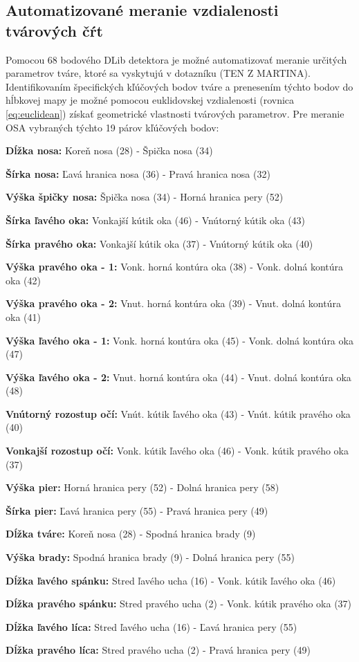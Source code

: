 \subsection{Automatizované meranie vzdialenosti tvárových čŕt}
Pomocou 68 bodového DLib detektora je možné automatizovať meranie určitých parametrov tváre, ktoré sa vyskytujú v dotazníku (TEN Z MARTINA). 
Identifikovaním špecifických kľúčových bodov tváre a prenesením týchto bodov do hĺbkovej mapy je možné pomocou euklidovskej vzdialenosti (rovnica \ref{eq:euclidean}) získať geometrické vlastnosti tvárových parametrov.
Pre meranie OSA vybraných týchto 19 párov kľúčových bodov: 
\vskip 0.2in

\begin{compactitem}
	\item[\textbf{Dĺžka nosa:}] Koreň nosa (28) - Špička nosa (34)
	\item[\textbf{Šírka nosa:}] Ľavá hranica nosa (36) - Pravá hranica nosa (32)
	\item[\textbf{Výška špičky nosa:}] Špička nosa (34) - Horná hranica pery (52)
	\item[\textbf{Šírka ľavého oka:}] Vonkajší kútik oka (46) - Vnútorný kútik oka (43)
	\item[\textbf{Šírka pravého oka:}] Vonkajší kútik oka (37) - Vnútorný kútik oka (40)
	\item[\textbf{Výška pravého oka - 1:}] Vonk. horná kontúra oka (38) - Vonk. dolná kontúra oka (42)
	\item[\textbf{Výška pravého oka - 2:}] Vnut. horná kontúra oka (39) - Vnut. dolná kontúra oka (41)
	\item[\textbf{Výška ľavého oka - 1:}] Vonk. horná kontúra oka (45) - Vonk. dolná kontúra oka (47)
	\item[\textbf{Výška ľavého oka - 2:}] Vnut. horná kontúra oka (44) - Vnut. dolná kontúra oka (48)
	\item[\textbf{Vnútorný rozostup očí:}] Vnút. kútik ľavého oka (43) - Vnút. kútik pravého oka (40)
	\item[\textbf{Vonkajší rozostup očí:}] Vonk. kútik ľavého oka (46) - Vonk. kútik pravého oka (37)
	\item[\textbf{Výška pier:}] Horná hranica pery (52) - Dolná hranica pery (58)
	\item[\textbf{Šírka pier:}] Ľavá hranica pery (55) - Pravá hranica pery (49)
	\item[\textbf{Dĺžka tváre:}] Koreň nosa (28) - Spodná hranica brady (9)
	\item[\textbf{Výška brady:}] Spodná hranica brady (9) - Dolná hranica pery (55)
	\item[\textbf{Dĺžka ľavého spánku:}] Stred ľavého ucha (16) - Vonk. kútik ľavého oka (46)
	\item[\textbf{Dĺžka pravého spánku:}] Stred pravého ucha (2) - Vonk. kútik pravého oka (37)
	\item[\textbf{Dĺžka ľavého líca:}] Stred ľavého ucha (16) - Ľavá hranica pery (55)
	\item[\textbf{Dĺžka pravého líca:}] Stred pravého ucha (2) - Pravá hranica pery (49)
\end{compactitem}

